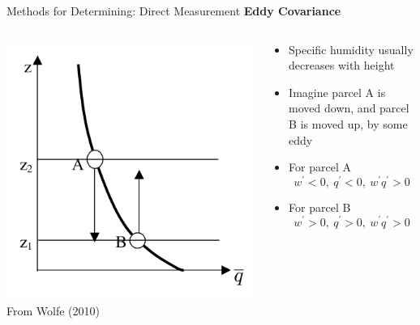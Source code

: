 
\begin{frame}{Methods for Determining: Direct Measurement}
\textbf{Eddy Covariance}
\begin{columns}[T]
    \begin{column}{.4\textwidth}
    \begin{minipage}[c][0.7\textheight][c]{\linewidth}
    \includegraphics[width=1\textwidth]{fig4}\\
    \centering \small From Wolfe (2010)
    \end{minipage}
    \end{column}
    \begin{column}{.6\textwidth}
    \begin{minipage}[c][0.6\textheight][c]{\linewidth}
   \begin{itemize}
   	\item Specific humidity usually decreases with height
   	\item Imagine parcel A is moved down, and parcel B is moved up, by some eddy
   	\item For parcel A
   	$$w^\prime <0,\ q^\prime < 0,\ w^\prime q^\prime>0$$
   	\item For parcel B
   	$$w^\prime >0,\ q^\prime > 0,\ w^\prime q^\prime>0$$
   \end{itemize}
      \end{minipage}
    \end{column}
  \end{columns}
\end{frame}

